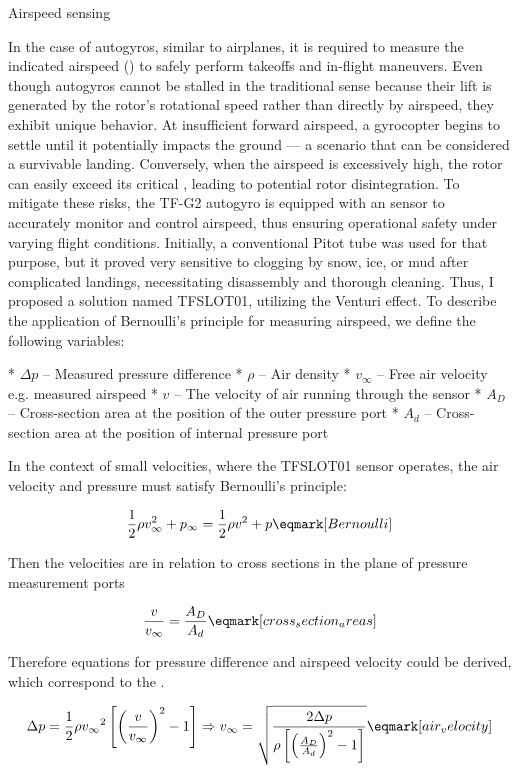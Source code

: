 \secc Airspeed sensing

In the case of autogyros, similar to airplanes, it is required to measure the indicated airspeed () to safely perform takeoffs and in-flight maneuvers. Even though autogyros cannot be stalled in the traditional sense because their lift is generated by the rotor's rotational speed rather than directly by airspeed, they exhibit unique behavior. At insufficient forward airspeed, a gyrocopter begins to settle until it potentially impacts the ground — a scenario that can be considered a survivable landing. Conversely, when the airspeed is excessively high, the rotor can easily exceed its critical , leading to potential rotor disintegration. To mitigate these risks, the TF-G2 autogyro is equipped with an   sensor to accurately monitor and control airspeed, thus ensuring operational safety under varying flight conditions.
Initially, a conventional Pitot tube was used for that purpose, but it proved very sensitive to clogging by snow, ice, or mud after complicated landings, necessitating disassembly and thorough cleaning. Thus, I proposed a solution named TFSLOT01, utilizing the Venturi effect.  To describe the application of Bernoulli’s principle for measuring airspeed, we define the following variables:

\begitems
* $\Delta p$ -- Measured pressure difference
* $\rho$ -- Air density
* $v_\infty$ -- Free air velocity e.g. measured airspeed
* $v$ -- The velocity of air running through the sensor
* $A_D$ -- Cross-section area at the position of the outer pressure port
* $A_d$ -- Cross-section area at the position of internal pressure port
\enditems

In the context of small velocities, where the TFSLOT01 sensor operates, the air velocity and pressure must satisfy Bernoulli’s principle:

$$ {1 \over 2}\rho v_\infty^{2} + p_\infty = {1 \over 2}\rho v^{2} + p \eqmark[Bernoulli]$$

Then the velocities are in relation to cross sections in the plane of pressure measurement ports

$$ {v \over v_\infty} = {A_D \over A_d} \eqmark[cross_section_areas]$$


Therefore equations for pressure difference and airspeed velocity could be derived, which correspond to the .

$$
\Delta p = {1 \over 2}\rho{v_\infty}^{2}\left[\left({v \over v_\infty}\right)^2 - 1\right] \Rightarrow v_\infty = \sqrt{{2\Delta p \over \rho\left[\left({A_D \over A_d}\right)^2 - 1\right]}}
\eqmark[air_velocity]
$$

